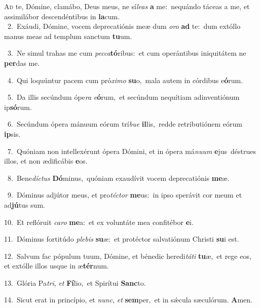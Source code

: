 \lettrine{\initial\textcolor{\initialcolor}{A}}{d} te, Dómine, clamábo, Deus meus, ne sí\-\textit{le}\-\textit{as} \textbf{a} me:~\star nequándo táceas a me, et assimilábor descendéntibus in \textbf{la}\-cum.\\
{\numbfont\textcolor{\numbcolor}{~2.}}~Exáudi, Dómine, vocem deprecatiónis meæ dum \textit{o}\-\textit{ro} \textbf{ad} te:~\star dum extóllo manus meas ad templum sanctum \textbf{tu}\-um.\par
{\numbfont\textcolor{\numbcolor}{~3.}}~Ne simul trahas me cum \textit{pec}\-\textit{ca}\textbf{tó}ribus:~\star et cum operántibus iniquitátem ne \textbf{per}\-das me.\par
{\numbfont\textcolor{\numbcolor}{~4.}}~Qui loquúntur pacem cum pró\-\textit{xi}\-\textit{mo} \textbf{su}\-o,~\star mala autem in córdibus e\-\textbf{ó}\-rum.\par
{\numbfont\textcolor{\numbcolor}{~5.}}~Da illis secúndum ópe\textit{ra} \textit{e}\-\textbf{ó}rum,~\star et secúndum nequítiam adinventiónum ip\-\textbf{só}\-rum.\par
{\numbfont\textcolor{\numbcolor}{~6.}}~Secúndum ópera mánuum eórum trí\-\textit{bu}\-\textit{e} \textbf{il}\-lis,~\star redde retributiónem eórum \textbf{ip}\-sis.\par
{\numbfont\textcolor{\numbcolor}{~7.}}~Quóniam non intellexérunt ópera Dómini, et in ópera má\-\textit{nu}\-\textit{um} \textbf{e}\-jus~\star déstrues illos, et non ædificábis \textbf{e}\-os.\par
{\numbfont\textcolor{\numbcolor}{~8.}}~Bene\-\textit{díc}\-\textit{tus} \textbf{Dó}\-minus,~\star quóniam exaudívit vocem deprecatiónis \textbf{me}\-æ.\par
{\numbfont\textcolor{\numbcolor}{~9.}}~Dóminus adjútor meus, et pro\-\textit{téc}\-\textit{tor} \textbf{me}\-us:~\star in ipso sperávit cor meum et ad\-\textbf{jú}\-tus sum.\par
{\numbfont\textcolor{\numbcolor}{10.}}~Et reflóruit \textit{ca}\-\textit{ro} \textbf{me}\-a:~\star et ex voluntáte mea confitébor \textbf{e}\-i.\par
{\numbfont\textcolor{\numbcolor}{11.}}~Dóminus fortitúdo \textit{ple}\-\textit{bis} \textbf{su}\-æ:~\star et protéctor salvatiónum Christi \textbf{su}\-i est.\par
{\numbfont\textcolor{\numbcolor}{12.}}~Salvum fac pópulum tuum, Dómine, et bénedic heredi\-\textit{tá}\-\textit{ti} \textbf{tu}\-æ,~\star et rege eos, et extólle illos usque in æ\-\textbf{tér}\-num.\par
{\numbfont\textcolor{\numbcolor}{13.}}~Glória Pa\-\textit{tri}\-, \textit{et} \textbf{Fí}\-lio,~\star et Spirítui \textbf{Sanc}\-to.\par
{\numbfont\textcolor{\numbcolor}{14.}}~Sicut erat in princípio, et \textit{nunc}\-, \textit{et} \textbf{sem}\-per,~\star et in sǽcula sæculórum. \textbf{A}\-men.\par
